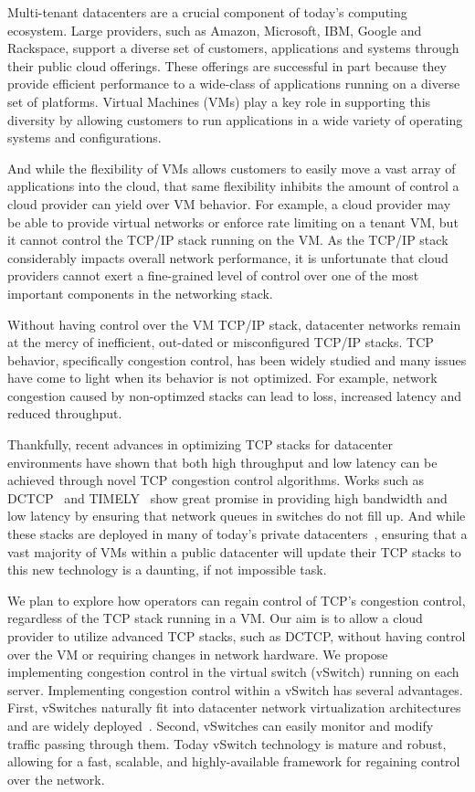 Multi-tenant datacenters are a crucial component of today's computing ecosystem. Large providers, such as Amazon, Microsoft, IBM, Google and Rackspace, support
a diverse set of customers, applications and systems through their public cloud offerings. These offerings are successful in
part because they provide efficient performance to a wide-class of applications running on a diverse set of platforms. Virtual
Machines (VMs) play a key role in supporting this diversity by allowing customers to run applications in a wide variety of
operating systems and configurations.

And while the flexibility of VMs allows customers to easily move a vast array of applications into the cloud, that same flexibility inhibits the
amount of control a cloud provider can yield over VM behavior. For example, a cloud provider may be able to provide virtual networks or enforce rate limiting
on a tenant VM, but it cannot control the TCP/IP stack running on the VM. As the TCP/IP stack considerably impacts overall network performance, it
is unfortunate that cloud providers cannot exert a fine-grained level of control over one of the most important components in the networking stack.

Without having control over the VM TCP/IP stack, datacenter networks remain at the mercy of inefficient, out-dated or misconfigured TCP/IP stacks.
TCP behavior, specifically congestion control, has been widely studied and many issues have come to light when its behavior is not optimized. For example,
network congestion caused by non-optimzed stacks can lead to loss, increased latency and reduced throughput.

Thankfully, recent advances in optimizing TCP stacks for datacenter environments have shown that both high throughput and low latency can be
achieved through novel TCP congestion control algorithms. Works such as DCTCP~\cite{alizadeh2011dctcp} and TIMELY~\cite{mittal2015timely} show great promise in providing high
bandwidth and low latency by ensuring that network queues in switches do not fill up. And while these stacks are deployed in many of today's
private datacenters~\cite{singh2015jupiter,judd2015dctcp}, ensuring that a vast majority of VMs within a public datacenter will update their TCP stacks
to this new technology is a daunting, if not impossible task.

We plan to explore how operators can regain control of TCP's congestion control, regardless of the TCP stack
running in a VM. Our aim is to allow a cloud provider to utilize advanced TCP stacks, such as DCTCP, without having
control over the VM or requiring changes in network hardware. We propose implementing congestion control in the virtual switch
(vSwitch) running on each server. Implementing congestion control within a vSwitch has several advantages.
First, vSwitches naturally fit into datacenter network virtualization architectures and are widely
deployed~\cite{pfaff2015design}. Second, vSwitches can easily monitor and modify traffic passing through them.
Today vSwitch technology is mature and robust, allowing for a fast, scalable,
and highly-available framework for regaining control over the network.

